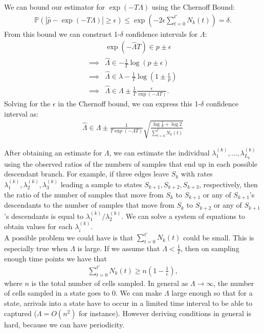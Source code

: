 \documentclass[11pt,onecolumn]{article}
\begin{document}
We can bound our estimator for $\exp(-T\Lambda)$ using the Chernoff Bound:
\begin{align*}
	\mathbb{P} \left( \left| \hat{p} - \exp(-T\Lambda) \right| \geq \epsilon \right)  \leq \exp\left(-2\epsilon \sum_{t=0}^{t'} N_k(t) \right) = \delta.
\end{align*}
From this bound we can construct 1-$\delta$ confidence intervals for $\Lambda$:
\begin{align*}
	& \exp(- \hat{\Lambda} T) \in {p} \pm \epsilon \\
	\implies & \hat{\Lambda} \in -\frac{1}{T} \log ({p} \pm \epsilon) \\
	\implies & \hat{\Lambda} \in \lambda - \frac{1}{T} \log \left( 1 \pm \frac{\epsilon}{p} \right) \\
	\implies & \hat{\Lambda} \in \Lambda \pm \frac{1}{T} \frac{\epsilon}{\exp(-\Lambda T)}.
\end{align*}
Solving for the $\epsilon$ in the Chernoff bound, we can express this 1-$\delta$ confidence interval as:
\begin{align*}
	\hat{\Lambda} \in \Lambda \pm \frac{1}{T\exp(-\Lambda T)} \sqrt{\frac{\log \frac{1}{\delta}+\log 2}{\sum_{t=0}^{t'} N_k(t)}} 
\end{align*}

After obtaining an estimate for $\Lambda$, we can estimate the individual $\lambda_1^{(k)},\dots,\lambda_{L_k}^{(k)}$ using the observed ratios of the numbers of samples that end up in each possible descendant branch. For example, if three edges leave $S_k$ with rates $\lambda_1^{(k)},\lambda_2^{(k)},\lambda_3^{(k)}$ leading a sample to states $S_{k+1},S_{k+2},S_{k+3}$, respectively, then the ratio of the number of samples that move from $S_k$ to $S_{k+1}$ or any of $S_{k+1}$'s descendants to the number of samples that move from $S_k$ to $S_{k+2}$ or any of $S_{k+1}$'s descendants is equal to $\lambda_1^{(k)}/\lambda_2^{(k)}$. We can solve a system of equations to obtain values for each $\lambda_i^{(k)}$. \\

A possible problem we could have is that $\sum_{t=0}^{t'} N_k(t)$ could be small. 
This is especially true when $\Lambda$ is large. If we assume that $\Lambda < \frac{1}{T}$, then on sampling enough time points we have that 
\begin{align*}
\sum_{t=0}^{t'} N_k(t) \ge n (1- \frac{1}{e}),
\end{align*}
where $n$ is the total number of cells sampled. In general as $\Lambda \rightarrow \infty$, the number of cells sampled in a state goes to $0$. We can make $\Lambda$  large enough so that for a state, arrivals into a state have to occur in a limited time interval to be able to captured ($\Lambda= O(n^2)$ for instance). However deriving conditions in general is hard, because we can have periodicity. \\
\end{document}
